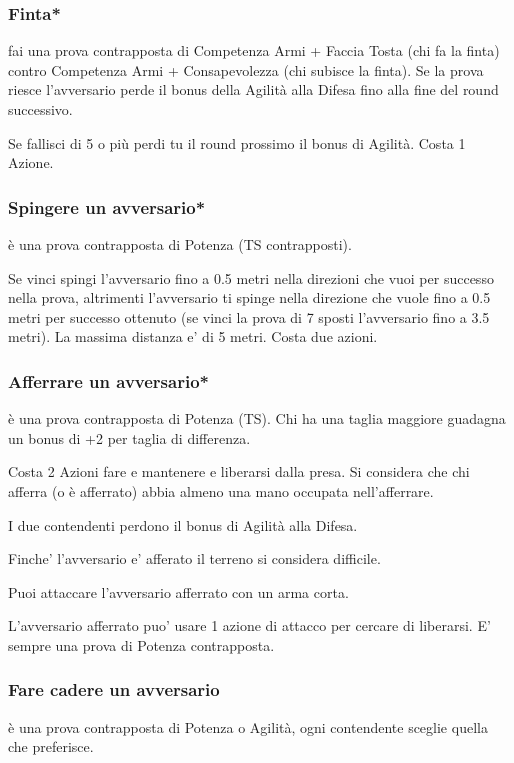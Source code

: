 \documentclass[a4paper,11pt,twoside,openany]{book}
\begin{document}
\subsubsection{Finta*} fai una prova contrapposta di Competenza Armi + Faccia Tosta (chi fa la finta) contro Competenza Armi + Consapevolezza (chi subisce la finta). Se la prova riesce l'avversario perde il bonus della Agilità alla Difesa fino alla fine del round successivo.

Se fallisci di 5 o più perdi tu il round prossimo il bonus di Agilità.
Costa 1 Azione.

\subsubsection{Spingere un avversario*} è una prova contrapposta di Potenza (TS contrapposti).

Se vinci spingi l'avversario fino a 0.5 metri nella direzioni che vuoi per successo nella prova, altrimenti l'avversario ti spinge nella direzione che vuole fino a 0.5 metri per successo ottenuto (se vinci la prova di 7 sposti l'avversario fino a 3.5 metri). La massima distanza e' di 5 metri.
Costa due azioni.

\subsubsection{Afferrare un avversario*} è una prova contrapposta di Potenza (TS). Chi ha una taglia maggiore guadagna un bonus di +2 per taglia di differenza.

Costa 2 Azioni fare e mantenere e liberarsi dalla presa. Si considera che chi afferra (o è afferrato) abbia almeno una mano occupata nell'afferrare.

I due contendenti perdono il bonus di Agilità alla Difesa. 

Finche' l'avversario e' afferato il terreno si considera difficile.

Puoi attaccare l'avversario afferrato con un arma corta.

L'avversario afferrato puo' usare 1 azione di attacco per cercare di liberarsi. E' sempre una prova di Potenza contrapposta.

\subsubsection{Fare cadere un avversario} è una prova contrapposta di Potenza o Agilità, ogni contendente sceglie quella che preferisce. 
\end{document}
